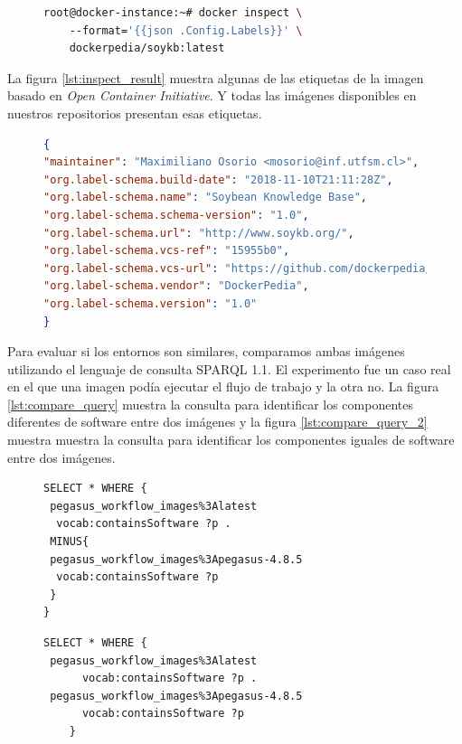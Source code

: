 \begin{figure}
\begin{lstlisting}[caption={Inspect image annotations},label={lst:inspect_command},language=bash]
root@docker-instance:~# docker inspect \ 
    --format='{{json .Config.Labels}}' \ 
    dockerpedia/soykb:latest
\end{lstlisting}
\end{figure}

La figura \ref{lst:inspect_result} muestra algunas de las etiquetas de la imagen basado en \textit{Open Container Initiative}. Y todas las imágenes disponibles en nuestros repositorios presentan esas etiquetas.

\begin{figure}
\begin{lstlisting}[caption={Inspect image annotations},label={lst:inspect_result},language=json]
{
"maintainer": "Maximiliano Osorio <mosorio@inf.utfsm.cl>",
"org.label-schema.build-date": "2018-11-10T21:11:28Z",
"org.label-schema.name": "Soybean Knowledge Base",
"org.label-schema.schema-version": "1.0",
"org.label-schema.url": "http://www.soykb.org/",
"org.label-schema.vcs-ref": "15955b0",
"org.label-schema.vcs-url": "https://github.com/dockerpedia/soykb",
"org.label-schema.vendor": "DockerPedia",
"org.label-schema.version": "1.0"
}

\end{lstlisting}
\end{figure}


Para evaluar si los entornos son similares, comparamos ambas imágenes utilizando el lenguaje de consulta SPARQL 1.1. El experimento fue un caso real en el que una imagen podía ejecutar el flujo de trabajo y la otra no. 
La figura \ref{lst:compare_query} muestra la consulta para identificar los componentes diferentes de software entre dos imágenes y la figura \ref{lst:compare_query_2} muestra muestra la consulta para identificar los componentes iguales de software entre dos imágenes.
\begin{figure}
\begin{lstlisting}[caption={¿Cuáles son los diferentes componentes entre dos imágenes?},label={lst:compare_query},language=sparql]
SELECT * WHERE {
 pegasus_workflow_images%3Alatest
  vocab:containsSoftware ?p .
 MINUS{
 pegasus_workflow_images%3Apegasus-4.8.5
  vocab:containsSoftware ?p   
 }
}
\end{lstlisting}
\end{figure}

\begin{figure}

\begin{lstlisting}[caption={¿Cuáles son los componentes que comparten entre dos imágenes?},label={lst:compare_query_2},language=sparql]
SELECT * WHERE {
 pegasus_workflow_images%3Alatest
      vocab:containsSoftware ?p .
 pegasus_workflow_images%3Apegasus-4.8.5
      vocab:containsSoftware ?p   
    }
    \end{lstlisting}
    \end{figure}

